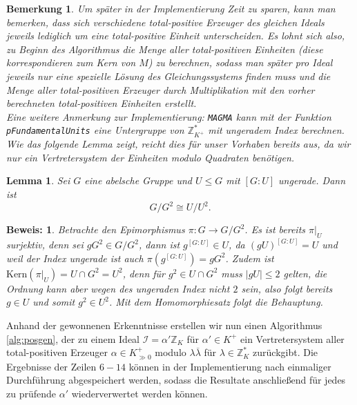 \documentclass[12pt,a4paper,halfparskip,headsepline,bibtotocnumbered]{scrreprt}
\theoremstyle{nummermitklammern}
\newtheorem{lemma}[defsatzusw]{Lemma}
\newtheorem{bemerkung}[defsatzusw]{Bemerkung}
\theoremstyle{nonumberbreak}
\newtheorem{beweis}{Beweis:}
\newcommand{\Z}{\mathbb{Z}}
\newcommand{\I}{\mathcal{I}}
\newcommand{\Kern}{\text{Kern}}
\begin{document}
\begin{bemerkung}
	Um später in der Implementierung Zeit zu sparen, kann man bemerken, dass sich verschiedene total-positive Erzeuger des gleichen Ideals jeweils lediglich um eine total-positive Einheit unterscheiden. Es lohnt sich also, zu Beginn des Algorithmus die Menge aller total-positiven Einheiten (diese korrespondieren zum Kern von $M$) zu berechnen, sodass man später pro Ideal jeweils nur eine spezielle Lösung des Gleichungssystems finden muss und die Menge aller total-positiven Erzeuger durch Multiplikation mit den vorher berechneten total-positiven Einheiten erstellt.\\
	Eine weitere Anmerkung zur Implementierung: \texttt{MAGMA} kann mit der Funktion\linebreak
	 \texttt{pFundamentalUnits} eine Untergruppe von $\Z_{K^+}^\ast$ mit ungeradem Index berechnen. Wie das folgende Lemma zeigt, reicht dies für unser Vorhaben bereits aus, da wir nur ein Vertretersystem der Einheiten modulo Quadraten benötigen.
\end{bemerkung}

\begin{framed}
	\begin{lemma}
		Sei $G$ eine abelsche Gruppe und $U \leq G$ mit $\left[ G : U \right]$ ungerade. Dann ist
		\begin{equation*}
			G / G^2 \cong U / U^2.
		\end{equation*}
	\end{lemma}
\end{framed}

\begin{beweis}
	Betrachte den Epimorphismus $\pi : G \rightarrow G / G^2$. Es ist bereits $\pi\vert_U$ surjektiv, denn sei $gG^2 \in G / G^2$, dann ist $g^{\left[ G : U \right]} \in U$, da $(gU)^{\left[ G : U \right]} = U$ und weil der Index ungerade ist auch $\pi\left(g^{\left[ G : U \right]}\right) = gG^2$. Zudem ist $\Kern(\pi\vert_U) = U \cap G^2 = U^2$, denn für $g^2 \in U\cap G^2$ muss $\vert gU \vert \leq 2$ gelten, die Ordnung kann aber wegen des ungeraden Index nicht $2$ sein, also folgt bereits $g \in U$ und somit $g^2 \in U^2$. Mit dem Homomorphiesatz folgt die Behauptung.
\end{beweis}


Anhand der gewonnenen Erkenntnisse erstellen wir nun einen Algorithmus \eqref{alg:posgen}, der zu einem Ideal $\I = \alpha' \Z_K$ für $\alpha' \in K^+$ ein Vertretersystem aller total-positiven Erzeuger $\alpha \in K_{\gg 0}^+$ modulo $\lambda \overline{\lambda}$ für $\lambda \in \Z_K^\ast$ zurückgibt. Die Ergebnisse der Zeilen $6 - 14$ können in der Implementierung nach einmaliger Durchführung abgespeichert werden, sodass die Resultate anschließend für jedes zu prüfende $\alpha'$ wiederverwertet werden können. 
\end{document}
